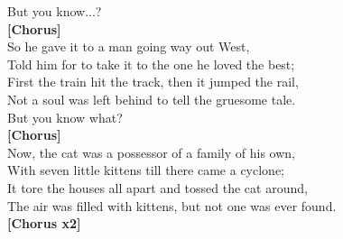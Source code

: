 \documentclass[10pt, twoside, a4paper]{article}
\begin{document}
But you know...? \\
\textbf{[Chorus]} \\

So he gave it to a man going way out West, \\
Told him for to take it to the one he loved the best; \\
First the train hit the track, then it jumped the rail, \\
Not a soul was left behind to tell the gruesome tale. \\

But you know what? \\
\textbf{[Chorus]} \\

Now, the cat was a possessor of a family of his own, \\
With seven little kittens till there came a cyclone; \\
It tore the houses all apart and tossed the cat around, \\
The air was filled with kittens, but not one was ever found. \\

\textbf{[Chorus x2]}
\end{document}
